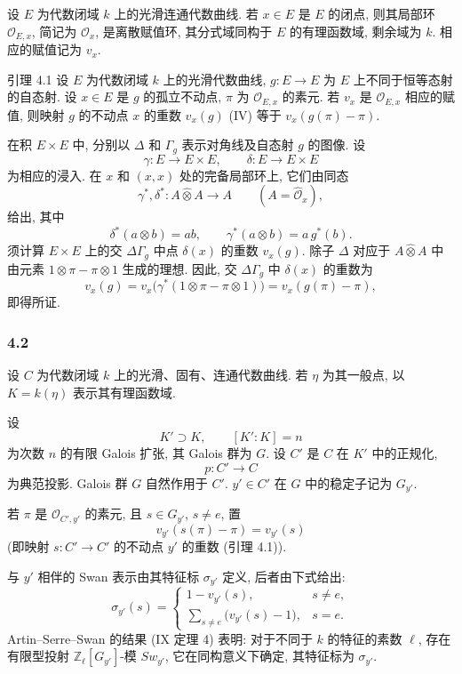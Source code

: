 设 $E$ 为代数闭域 $k$ 上的光滑连通代数曲线. 若 $x\in E$ 是 $E$ 的闭点, 则其局部环 $\mathcal O_{E,x}$, 简记为 $\mathcal O_x$, 是离散赋值环, 其分式域同构于 $E$ 的有理函数域, 剩余域为 $k$. 相应的赋值记为 $v_x$.

\begin{statement}{引理 4.1}
设 $E$ 为代数闭域 $k$ 上的光滑代数曲线, $g:E\to E$ 为 $E$ 上不同于恒等态射的自态射. 设 $x\in E$ 是 $g$ 的孤立不动点, $\pi$ 为 $\mathcal O_{E,x}$ 的素元. 若 $v_x$ 是 $\mathcal O_{E,x}$ 相应的赋值, 则映射 $g$ 的不动点 $x$ 的重数 $v_x(g)$ (IV) 等于 $v_x(g(\pi)-\pi)$.
\end{statement}


在积 $E\times E$ 中, 分别以 $\Delta$ 和 $\Gamma_g$ 表示对角线及自态射 $g$ 的图像. 设
\[
\gamma:E\longrightarrow E\times E,\qquad
\delta:E\longrightarrow E\times E
\]
为相应的浸入. 在 $x$ 和 $(x,x)$ 处的完备局部环上, 它们由同态
\[
\gamma^*,\delta^*:A\widehat\otimes A\longrightarrow A
\qquad (A=\widehat{\mathcal O}_x),
\]
给出, 其中
\[
\delta^*(a\otimes b)=ab,\qquad
\gamma^*(a\otimes b)=a\,g^*(b).
\]
须计算 $E\times E$ 上的交 $\Delta\Gamma_g$ 中点 $\delta(x)$ 的重数 $v_x(g)$. 除子 $\Delta$ 对应于 $A\widehat\otimes A$ 中由元素 $1\otimes\pi-\pi\otimes1$ 生成的理想. 因此, 交 $\Delta\Gamma_g$ 中 $\delta(x)$ 的重数为
\[
v_x(g)=v_x\bigl(\gamma^*(1\otimes\pi-\pi\otimes1)\bigr)
      =v_x(g(\pi)-\pi),
\]
即得所证.

\subsubsection*{4.2}

设 $C$ 为代数闭域 $k$ 上的光滑、固有、连通代数曲线. 若 $\eta$ 为其一般点, 以 $K=k(\eta)$ 表示其有理函数域.

设
\[
K'\supset K,\qquad [K':K]=n
\]
为次数 $n$ 的有限 Galois 扩张, 其 Galois 群为 $G$. 设 $C'$ 是 $C$ 在 $K'$ 中的正规化,
\[
p:C'\longrightarrow C
\]
为典范投影. Galois 群 $G$ 自然作用于 $C'$. $y'\in C'$ 在 $G$ 中的稳定子记为 $G_{y'}$.

若 $\pi$ 是 $\mathcal O_{C',y'}$ 的素元, 且 $s\in G_{y'}$, $s\ne e$, 置
\[
v_{y'}(s(\pi)-\pi)=v_{y'}(s)
\tag{4.2.1}
\]
(即映射 $s:C'\to C'$ 的不动点 $y'$ 的重数 (引理 4.1)).

与 $y'$ 相伴的 Swan 表示由其特征标 $\sigma_{y'}$ 定义, 后者由下式给出:
\[
\sigma_{y'}(s)=
\begin{cases}
1-v_{y'}(s),& s\ne e,\\[0.4em]
\displaystyle\sum_{s\ne e}\bigl(v_{y'}(s)-1\bigr),& s=e.
\end{cases}
\tag{4.2.2}
\]
Artin--Serre--Swan 的结果 (IX 定理 4) 表明: 对于不同于 $k$ 的特征的素数 $\ell$, 存在有限型投射 $\mathbb Z_\ell[G_{y'}]$-模 $Sw_{y'}$, 它在同构意义下确定, 其特征标为 $\sigma_{y'}$.

